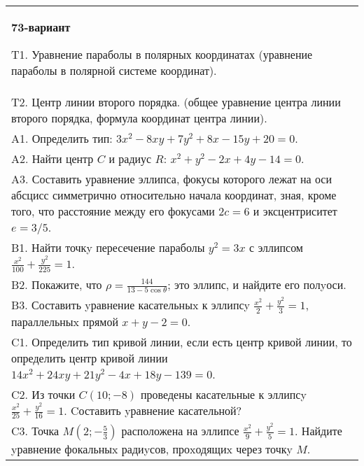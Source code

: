 \documentclass{article}
\begin{document}
\begin{tabular}{m{17cm}}
\textbf{73-вариант}
\newline

T1. Уравнение параболы в полярных координатах (уравнение параболы в полярной системе координат).\\

T2. Центр линии второго порядка. (общее уравнение центра линии второго порядка, формула координат центра линии).\\

A1. Определить тип: $3x^{2}-8xy+7y^{2}+8x-15y+20=0$.\\

A2. Найти центр $C$ и радиус $R$: $x^2+y^2-2x+4y-14=0$.\\

A3. Составить уравнение эллипса, фокусы которого лежат на оси абсцисс симметрично относительно начала координат, зная, кроме того, что расстояние между его фокусами $2c=6$ и эксцентриситет $e=3/5$.\\

B1. Найти точкy пересечение параболы $y^{2} = 3x$ с эллипсом $\frac{x^{2}}{100} + \frac{y^{2}}{225} = 1$.  \\

B2. Покажите, что $\rho = \frac{144}{13 - 5\cos\theta}$; это эллипс, и найдите его полyоси.\\

B3. Составить yравнение касательныx к эллипсy $\frac{x^{2}}{2} + \frac{y^{2}}{3} = 1$, параллельныx прямой $x + y - 2 = 0$.  \\

C1. Определить тип кривой линии, если есть центр кривой линии, то определить центр кривой линии $14x^{2}+24xy+21y^{2}-4x+18y-139=0$.  \\

C2. Из точки $C(10;-8)$ проведены касательные к эллипсy $\frac{x^{2}}{25}+\frac{y^{2}}{16}=1$. Cоставить yравнение касательной?  \\

C3. Точка $M(2;-\frac{5}{3})$ расположена на эллипсе $\frac{x^{2}}{9}+\frac{y^{2}}{5}=1$. Найдите yравнение фокальныx радиyсов, проxодящиx через точкy $M$.  \\

\end{tabular}
\vspace{1cm}
\end{document}
